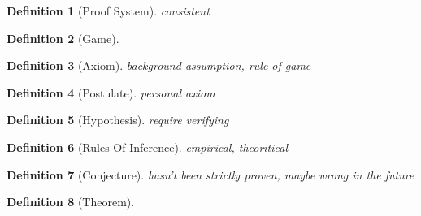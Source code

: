 \documentclass{article}
\newtheorem{definition}{Definition}
\begin{document}
\begin{definition}[Proof System]
    consistent
\end{definition}

\begin{definition}[Game]
\end{definition}

\begin{definition}[Axiom]
    background assumption, rule of game
\end{definition}

\begin{definition}[Postulate]
    personal axiom
\end{definition}

\begin{definition}[Hypothesis]
    require verifying
\end{definition}

\begin{definition}[Rules Of Inference]
    empirical,
    theoritical
\end{definition}

\begin{definition}[Conjecture]
    hasn't been strictly proven, maybe wrong in the future
\end{definition}

\begin{definition}[Theorem]
\end{definition}
\end{document}
